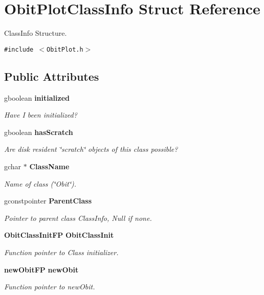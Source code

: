 \section{Obit\-Plot\-Class\-Info Struct Reference}
\label{structObitPlotClassInfo}
Class\-Info Structure.  


{\tt \#include $<$Obit\-Plot.h$>$}

\subsection*{Public Attributes}
\begin{CompactItemize}
\item 
gboolean {\bf initialized}
\begin{CompactList}\small\item\em Have I been initialized? \item\end{CompactList}\item 
gboolean {\bf has\-Scratch}
\begin{CompactList}\small\item\em Are disk resident \char`\"{}scratch\char`\"{} objects of this class possible? \item\end{CompactList}\item 
gchar $\ast$ {\bf Class\-Name}
\begin{CompactList}\small\item\em Name of class (\char`\"{}Obit\char`\"{}). \item\end{CompactList}\item 
gconstpointer {\bf Parent\-Class}
\begin{CompactList}\small\item\em Pointer to parent class Class\-Info, Null if none. \item\end{CompactList}\item 
{\bf Obit\-Class\-Init\-FP} {\bf Obit\-Class\-Init}
\begin{CompactList}\small\item\em Function pointer to Class initializer. \item\end{CompactList}\item 
{\bf new\-Obit\-FP} {\bf new\-Obit}
\begin{CompactList}\small\item\em Function pointer to new\-Obit. \item\end{CompactList}\item 

\end{CompactItemize}
